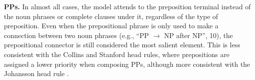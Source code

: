 \documentclass[11pt]{article}
\newcommand{\ask}[1]{\textcolor{orange}{{\textbf{[#1 --\textsc{ask}]}}}}
\newcommand{\nascomment}[1]{\textcolor{blue}{{\textbf{[#1 --\textsc{nas}]}}}}
\newcommand{\miguelcomment}[1]{\textcolor{red}{{\textbf{[#1 --\textsc{miguel}]}}}}
\renewcommand{\ask}[1]{}
\renewcommand{\nascomment}[1]{}
\renewcommand{\miguelcomment}[1]{}
\begin{document}
\textbf{PPs.} In almost all cases, the model attends to the preposition terminal instead of the noun phrases or complete clauses under it, regardless of the type of preposition. Even when the prepositional phrase is only used to make a connection between two noun phrases (e.g., ``PP $\to$ NP after NP'', 10), the prepositional connector is still considered the most salient element. This is less consistent with the Collins and Stanford head rules, where prepositions are assigned a lower priority when composing PPs, although more consistent with the Johansson head rule \cite{Johansson:07}.\ask{To my understanding there is some contention on what the head of a preposition phrase should be. Some might say that the preposition symbol is not important and we should instead pay attention to whatever is under it, but some others say that the preposition symbol is indeed the head. I'm not sure how to formulate this, we should probably cite some previous works that talk and discuss about this.} 




\mydata
\end{document}

